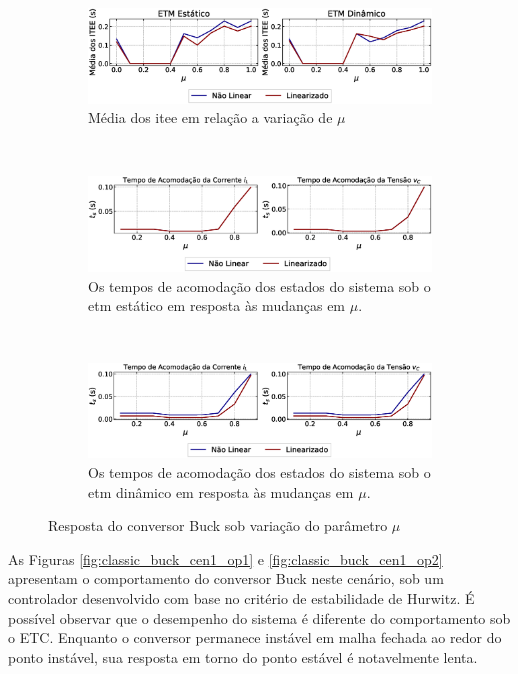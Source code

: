 \begin{figure}[H]
  \centering
  \captionsetup{justification=centering}
  \begin{subfigure}{1.\textwidth}
    \centering
    \includegraphics[width=1.\textwidth]{figuras/itee-mean.eps}
    \caption{Média dos \acrshort{itee} em relação a variação de $\mu$}
  \end{subfigure}
  \\[6pt]
  \begin{subfigure}{1.\textwidth}
    \centering
    \includegraphics[width=1.\textwidth]{figuras/static_ts.eps}
    \caption{Os tempos de acomodação dos estados do sistema sob o \acrshort{etm} estático em resposta às mudanças em $\mu$.}
  \end{subfigure}
  \\[6pt]
  \begin{subfigure}{1.\textwidth}
    \centering
    \includegraphics[width=1.\textwidth]{figuras/dynamic_ts.eps}
    \caption{Os tempos de acomodação dos estados do sistema sob o \acrshort{etm} dinâmico em resposta às mudanças em $\mu$.}
  \end{subfigure}
  \caption{Resposta do conversor Buck sob variação do parâmetro $\mu$}
  \label{fig:buck_converter_mu}
\end{figure}


As Figuras \ref{fig:classic_buck_cen1_op1} e \ref{fig:classic_buck_cen1_op2} apresentam o comportamento do conversor Buck neste cenário, sob um controlador desenvolvido com base no critério de estabilidade de Hurwitz. É possível observar que o desempenho do sistema é diferente do comportamento sob o ETC. Enquanto o conversor permanece instável em malha fechada ao redor do ponto instável, sua resposta em torno do ponto estável é notavelmente lenta.

